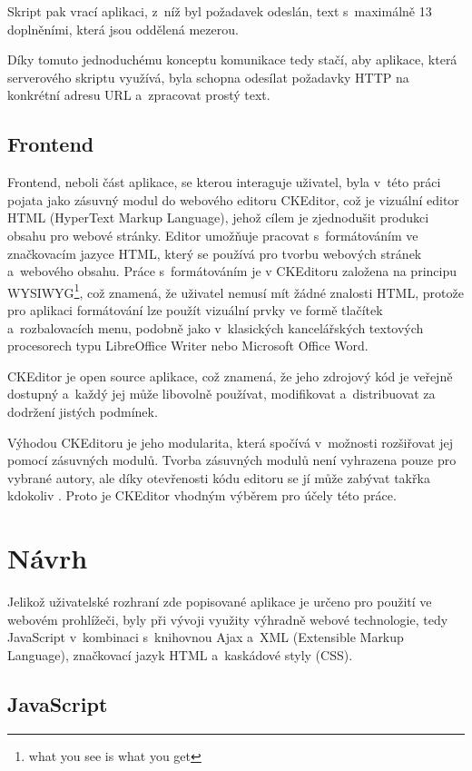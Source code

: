 \documentclass[a4paper,11pt,openany]{book} %
\begin{document}
Skript pak vrací aplikaci, z~níž byl požadavek odeslán, text s~maximálně 13 doplněními, která jsou oddělená mezerou.

Díky tomuto jednoduchému konceptu komunikace tedy stačí, aby aplikace, která serverového skriptu využívá, byla schopna odesílat požadavky HTTP na konkrétní adresu URL a~zpracovat prostý text. 

\section{Frontend}

Frontend, neboli část aplikace, se kterou interaguje uživatel, byla v~této práci pojata jako zásuvný modul do webového editoru CKEditor, což je vizuální editor HTML (HyperText Markup Language), jehož cílem je zjednodušit produkci obsahu pro webové stránky. Editor umožňuje pracovat s~formátováním ve značkovacím jazyce HTML, který se používá pro tvorbu webových stránek a~webového obsahu. Práce s~formátováním je v CKEditoru založena na principu WYSIWYG\footnote{what you see is what you get}, což znamená, že uživatel nemusí mít žádné znalosti HTML, protože pro aplikaci formátování lze použít vizuální prvky ve formě tlačítek a~rozbalovacích menu, podobně jako v~klasických kancelářských textových procesorech typu LibreOffice Writer nebo Microsoft Office Word.

CKEditor je open source aplikace, což znamená, že jeho zdrojový kód je veřejně dostupný a~každý jej může libovolně používat, modifikovat a~distribuovat za dodržení jistých podmínek. 

Výhodou CKEditoru je jeho modularita, která spočívá v~možnosti rozšiřovat jej pomocí zásuvných modulů. Tvorba zásuvných modulů není vyhrazena pouze pro vybrané autory, ale  díky otevřenosti kódu editoru se jí může zabývat takřka kdokoliv \parencite{cksource2015}. Proto je CKEditor vhodným výběrem pro účely této práce. %

\chapter{Návrh}\label{navrh}

Jelikož uživatelské rozhraní zde popisované aplikace je určeno pro použití ve webovém prohlížeči, byly při vývoji využity výhradně webové technologie, tedy JavaScript v~kombinaci s~knihovnou Ajax a~XML (Extensible Markup Language), značkovací jazyk HTML a~kaskádové styly (CSS). 

\section{JavaScript}
\end{document}
